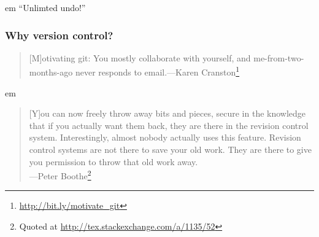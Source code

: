 \documentclass{beamer}
\begin{document}
\begin{frame}
{\begin{minipage}{\textwidth}

\end{minipage}
}
\pause
{} em
``Unlimted undo!''

\end{frame}

\begin{frame}
\frametitle{Why version control?}

\begin{quote}[M]otivating git: You mostly collaborate with yourself, and me-from-two-months-ago never responds to email.---Karen Cranston\footnote{\url{http://bit.ly/motivate_git}}
\end{quote}

\pause

 em


\begin{quote}
  [Y]ou can now freely throw away bits and pieces, secure in the knowledge that if you actually want them back, they are there in the revision control system. Interestingly, almost nobody actually uses this feature. Revision control systems are not there to save your old work. They are there to give you permission to throw that old work away.\\
  ---Peter Boothe\footnote{Quoted at \url{http://tex.stackexchange.com/a/1135/52}}
\end{quote}

\end{frame}
\end{document}
